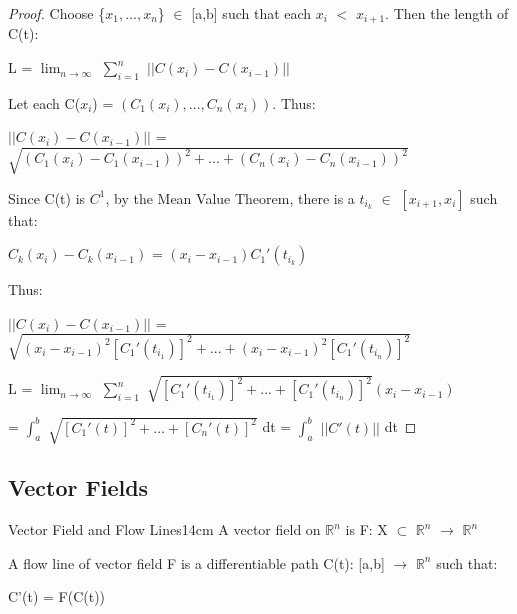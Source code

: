     \begin{proof}
        Choose \{$x_1,...,x_n$\} $\in$ [a,b] such that each $x_i$ $<$ $x_{i+1}$.
        Then the length of C(t):

        \hspace{0.5cm}
        L = $\lim_{n \rightarrow \infty}$ $\sum_{i=1}^n$ $||C(x_i) - C(x_{i-1})||$

        Let each C($x_i$) = $(C_1(x_i),...,C_n(x_i))$. Thus:
        
        \hspace{0.5cm}
        $||C(x_i) - C(x_{i-1})||$
        = $\sqrt{(C_1(x_i)-C_1(x_{i-1}))^2 + ... + (C_n(x_i)-C_n(x_{i-1}))^2}$

        Since C(t) is $C^1$, by the Mean Value Theorem,
        there is a $t_{i_k}$ $\in$ $[x_{i+1},x_i]$ such that:

        \hspace{0.5cm}
        $C_k(x_i) - C_k(x_{i-1})$
        = $(x_i - x_{i-1})C_1'(t_{i_k})$

        Thus:

        \hspace{0.5cm}
        $||C(x_i) - C(x_{i-1})||$
        = $\sqrt{(x_i-x_{i-1})^2[C_1'(t_{i_1})]^2
                + ... + (x_i-x_{i-1})^2[C_1'(t_{i_n})]^2}$

        \hspace{0.5cm}
        L = $\lim_{n \rightarrow \infty}$ $\sum_{i=1}^n$
            $\sqrt{[C_1'(t_{i_1})]^2 + ... + [C_1'(t_{i_n})]^2}(x_i - x_{i-1})$
        
        \hspace{0.9cm}
        = $\int_a^b$ $\sqrt{[C_1'(t)]^2 + ... + [C_n'(t)]^2}$ dt
        = $\int_a^b$ $||C'(t)||$ dt 
    \end{proof}

    \vspace{0.5cm}





\subsection{ Vector Fields }

    \begin{definition}{Vector Field and Flow Lines}{14cm}
        A {\color{lblue} vector field} on $\mathbb{R}^n$ is
        F: X $\subset$ $\mathbb{R}^n$ $\rightarrow$ $\mathbb{R}^n$

        \vspace{0.5cm}

        A {\color{lblue} flow line} of vector field F
        is a differentiable path C(t): [a,b] $\rightarrow$ $\mathbb{R}^n$
        such that:

        \hspace{0.5cm}
        C'(t) = F(C(t))
    \end{definition}

